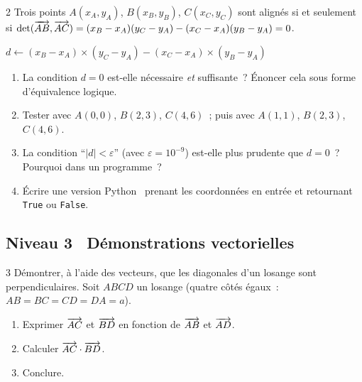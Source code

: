 \begin{exo}{2}
Trois points $A(x_A,y_A)$, $B(x_B,y_B)$, $C(x_C,y_C)$ sont align\'es
si et seulement si $\det(\overrightarrow{AB},\overrightarrow{AC}) = (x_B-x_A)(y_C-y_A)-(x_C-x_A)(y_B-y_A) = 0$.

\begin{algorithm}[H]
\caption{Test d'alignement de trois points}
$d \leftarrow (x_B-x_A)\times(y_C-y_A) - (x_C-x_A)\times(y_B-y_A)$\;
\end{algorithm}

\begin{enumerate}
  \item La condition $d=0$ est-elle n\'ecessaire \emph{et} suffisante~?
        \'Enoncer cela sous forme d'\'equivalence logique.
  \item Tester avec $A(0,0)$, $B(2,3)$, $C(4,6)$~;
        puis avec $A(1,1)$, $B(2,3)$, $C(4,6)$.
  \item La condition ``$|d| < \varepsilon$'' (avec $\varepsilon=10^{-9}$)
        est-elle plus prudente que $d=0$~?
        Pourquoi dans un programme~?
  \item \'Ecrire une version Python \computer\ prenant les coordonn\'ees
        en entr\'ee et retournant \texttt{True} ou \texttt{False}.
\end{enumerate}
\end{exo}

\subsection*{\quad Niveau 3 \textemdash\ D\'emonstrations vectorielles}

\begin{exo}{3}
D\'emontrer, \`a l'aide des vecteurs, que les diagonales d'un losange
sont perpendiculaires.
Soit $ABCD$ un losange (quatre c\^ot\'es \'egaux~: $AB=BC=CD=DA=a$).
\begin{enumerate}
  \item Exprimer $\overrightarrow{AC}$ et $\overrightarrow{BD}$ en fonction de $\overrightarrow{AB}$ et $\overrightarrow{AD}$.
  \item Calculer $\overrightarrow{AC}\cdot\overrightarrow{BD}$.
  \item Conclure.
\end{enumerate}
\end{exo}

